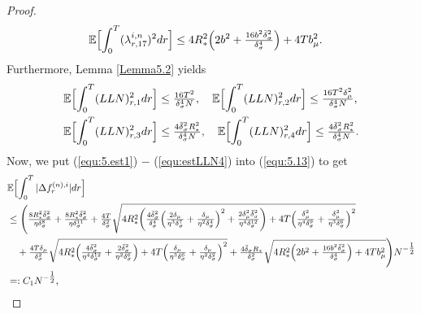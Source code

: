\documentclass[10pt,a4paper]{amsart}
\begin{document}
\begin{proof}
\begin{align}
\mathbb{E}\Bigl[\int_{0}^{T}(\lambda_{r,17}^{i,n})^{2}dr\Bigr] &\leq 4R_{*}^{2}\Bigl(2b^{2}+\tfrac{16b^{2}\bar{\delta}_{\sigma}^{2}}{\delta_{\sigma}^{4}}\Bigr) + 4Tb_{\mu}^{2}. \label{equ:estlambda17}
\end{align}
Furthermore, Lemma \ref{Lemma5.2} yields
\begin{align}
\mathbb{E}\Bigl[\int_{0}^{T}(LLN)_{r,1}^{2}dr\Bigr] &\leq \tfrac{16T^{2}}{\delta_{\sigma}^{4}N}, \ \ \ 
\mathbb{E}\Bigl[\int_{0}^{T}(LLN)_{r,2}^{2}dr\Bigr] \leq \tfrac{16T^{2}\delta_{\mu}^{2}}{\delta_{\sigma}^{4}N}, \label{equ:estLLN2} \\
\mathbb{E}\Bigl[\int_{0}^{T}(LLN)_{r,3}^{2}dr\Bigr] &\leq \tfrac{4\bar{\delta}_{\sigma}^{2}R_{*}^{2}}{\delta_{\sigma}^{4}N}, \ \ \  
\mathbb{E}\Bigl[\int_{0}^{T}(LLN)_{r,4}^{2}dr\Bigr] \leq \tfrac{4\bar{\delta}_{\sigma}^{2}R_{*}^{2}}{\delta_{\sigma}^{4}N} \label{equ:estLLN4}.
\end{align}
Now, we put (\ref{equ:5.est1}) $-$ (\ref{equ:estLLN4}) into (\ref{equ:5.13}) to get
\begin{align}
&\mathbb{E}\Bigl[\int_{0}^{T}|\Delta f_{r}^{(n),i}|dr\Bigr] \nonumber \\
&\leq \Biggl(\tfrac{8R_{*}^{2}\bar{\delta}_{\sigma}^{2}}{\eta \delta_{\sigma}^{8}} + \tfrac{8R_{*}^{2}\bar{\delta}_{\sigma}^{2}}{\eta \delta_{\sigma}^{11}} + \tfrac{4T}{\delta_{\sigma}^{2}}\sqrt{4R_{*}^{2}\biggl(\tfrac{4\bar{\delta}_{\sigma}^{2}}{\delta_{\sigma}^{4}}\Bigl(\tfrac{2\delta_{\mu}}{\eta^{3}\delta_{\sigma}^{7}} + \tfrac{\delta_{\mu}}{\eta^{2}\delta_{\sigma}^{4}}\Bigr)^{2} + \tfrac{2\delta_{\mu}^{2}\bar{\delta}_{\sigma}^{2}}{\eta^{4}\delta_{\sigma}^{12}}\biggr) + 4T\Bigl(\tfrac{\delta_{\mu}^{2}}{\eta^{4}\delta_{\sigma}^{9}} + \tfrac{\delta_{\mu}^{2}}{\eta^{3}\delta_{\sigma}^{6}}\Bigr)^{2}} \nonumber \\
&\ \ \ + \tfrac{4T\delta_{\mu}}{\delta_{\sigma}^{2}}\sqrt{4R_{*}^{2}\Bigl(\tfrac{4\bar{\delta}_{\sigma}^{2}}{\eta^{4}\delta_{\sigma}^{12}} + \tfrac{2\bar{\delta}_{\sigma}^{2}}{\eta^{2}\delta_{\sigma}^{6}}\Bigr) + 4T\Bigl(\tfrac{\delta_{\mu}}{\eta^{3}\delta_{\sigma}^{6}} + \tfrac{\delta_{\mu}}{\eta^{2}\delta_{\sigma}^{2}}\Bigr)^{2}} + \tfrac{4\bar{\delta}_{\sigma}R_{*}}{\delta_{\sigma}^{2}}\sqrt{4R_{*}^{2}\Bigl(2b^{2}+\tfrac{16b^{2}\bar{\delta}_{\sigma}^{2}}{\delta_{\sigma}^{4}}\Bigr) + 4Tb_{\mu}^{2}} \Biggr)N^{-\tfrac{1}{2}} \nonumber \\
&=: C_{1}N^{-\tfrac{1}{2}}, \label{equ:estdiff_2}

\end{align}
\end{proof}
\end{document}
